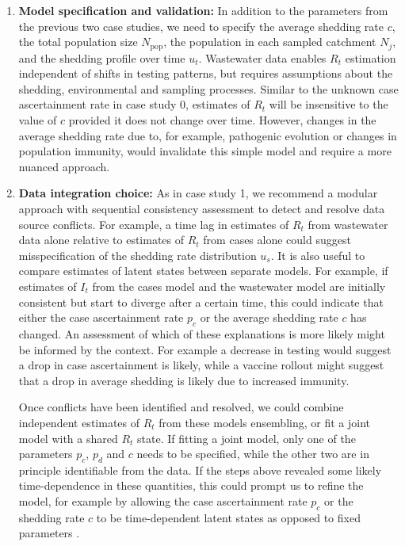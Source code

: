 \documentclass{article}
\begin{document}
\begin{enumerate}
    \item \textbf{Model specification and validation:} In addition to the parameters from the previous two case studies, we need to specify the average shedding rate $c$, the total population size $N_\mathrm{pop}$, the population in each sampled catchment $N_j$, and the shedding profile over time $u_t$. Wastewater data enables $R_t$ estimation independent of shifts in testing patterns, but requires assumptions about the shedding, environmental and sampling processes. Similar to the unknown case ascertainment rate in case study 0, estimates of $R_t$ will be insensitive to the value of $c$ provided it does not change over time. However, changes in the average shedding rate due to, for example, pathogenic evolution or changes in population immunity, would invalidate this simple model and require a more nuanced approach. 
    
    \item \textbf{Data integration choice:} As in case study 1, we recommend a modular approach with sequential consistency assessment to detect and resolve data source conflicts. For example, a time lag in estimates of $R_t$ from wastewater data alone relative to estimates of $R_t$ from cases alone could suggest misspecification of the shedding rate distribution $u_s$.  It is also useful to compare estimates of latent states between separate models. For example, if estimates of $I_t$ from the cases model and the wastewater model are initially consistent but start to diverge after a certain time, this could indicate that either the case ascertainment rate $p_c$ or the average shedding rate $c$ has changed. An assessment of which of these explanations is more likely might be informed by the context. For example a decrease in testing would suggest a drop in case ascertainment is likely, while a vaccine rollout might suggest that a drop in average shedding is likely due to increased immunity. 

    Once conflicts have been identified and resolved, we could combine independent estimates of $R_t$ from these models ensembling, or fit a joint model with a shared $R_t$ state. If fitting a joint model, only one of the parameters $p_c$, $p_d$ and $c$ needs to be specified, while the other two are in principle identifiable from the data. If the steps above revealed some likely time-dependence in these quantities, this could prompt us to refine the model, for example by allowing the case ascertainment rate $p_c$ or the shedding rate $c$ to be time-dependent latent states as opposed to fixed parameters \citep{watson2024jointly}. 
\end{enumerate}
\end{document}

